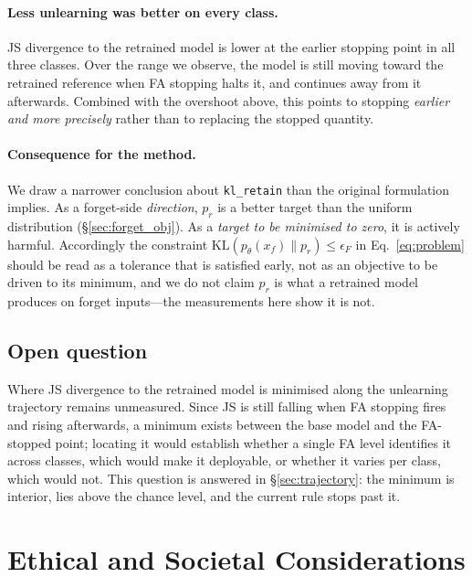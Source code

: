 \documentclass{article}
\newcommand{\klr}{\texttt{kl\_retain}}
\newcommand{\KL}{\mathrm{KL}}
\theoremstyle{remark}
\theoremstyle{plain}
\begin{document}
\paragraph{Less unlearning was better on every class.}
JS divergence to the retrained model is lower at the earlier stopping point in
all three classes. Over the range we observe, the model is still moving toward
the retrained reference when FA stopping halts it, and continues away from it
afterwards. Combined with the overshoot above, this points to stopping
\emph{earlier and more precisely} rather than to replacing the stopped quantity.

\paragraph{Consequence for the method.}
We draw a narrower conclusion about \klr{} than the original formulation
implies. As a forget-side \emph{direction}, $p_r$ is a better target than the
uniform distribution (\S\ref{sec:forget_obj}). As a \emph{target to be minimised
to zero}, it is actively harmful. Accordingly the constraint
$\KL(p_\theta(x_f)\|p_r)\le\epsilon_F$ in Eq.~\ref{eq:problem} should be read as
a tolerance that is satisfied early, not as an objective to be driven to its
minimum, and we do not claim $p_r$ is what a retrained model produces on forget
inputs---the measurements here show it is not.

\subsection{Open question}

Where JS divergence to the retrained model is minimised along the unlearning
trajectory remains unmeasured. Since JS is still falling when FA stopping fires
and rising afterwards, a minimum exists between the base model and the FA-stopped
point; locating it would establish whether a single FA level identifies it across
classes, which would make it deployable, or whether it varies per class, which
would not.
This question is answered in \S\ref{sec:trajectory}: the minimum is interior, lies above the chance level, and the current rule stops past it.

\section{Ethical and Societal Considerations}\label{app:ethics}
\end{document}
